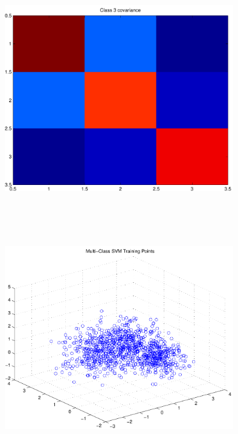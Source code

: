 \documentclass[9pt]{article}
\theoremstyle{plain}
\theoremstyle{definition}
\theoremstyle{remark}
\numberwithin{equation}{section}
\begin{document}
\includegraphics[width=10.0cm,height=10.0cm]{rv3_corr.pdf}

\includegraphics[width=10.0cm,height=10.0cm]{trainingPoints.pdf}
\end{document}
